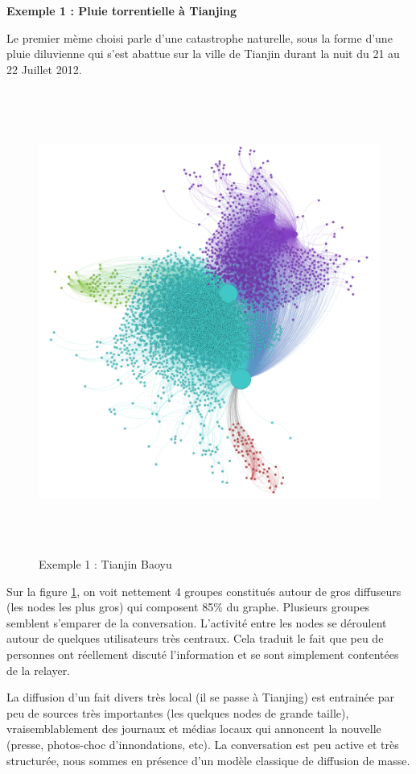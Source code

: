 \textbf{Exemple 1 : Pluie torrentielle à Tianjing}

Le premier mème choisi parle d{\textquoteright}une catastrophe naturelle, sous la forme d{\textquoteright}une pluie diluvienne qui s{\textquoteright}est abattue sur la ville de Tianjin durant la nuit du 21 au 22 Juillet 2012.

\begin{figure}[h!]
    \centering
    \includegraphics[width=6in,height=6in]{figures/chap3/chapitre3-img17.png}
    \caption{Exemple 1 : Tianjin Baoyu}
    \label{fig:graph-tianjin}
\end{figure}

Sur la figure \ref{fig:graph-tianjin}, on voit nettement 4 groupes constitués autour de gros diffuseurs (les nodes les plus gros) qui composent 85\% du graphe. Plusieurs groupes semblent s{\textquoteright}emparer de la conversation. L'activité entre les nodes se déroulent autour de quelques utilisateurs très centraux. Cela traduit le fait que peu de personnes ont réellement discuté l{\textquoteright}information et se sont simplement contentées de la relayer.


La diffusion d{\textquoteright}un fait divers très local (il se passe à Tianjing) est entrainée par peu de sources très importantes (les quelques nodes de grande taille), vraisemblablement des journaux et médias locaux qui annoncent la nouvelle (presse, photos-choc d{\textquoteright}innondations, etc). La conversation est peu active et très structurée, nous sommes en présence d{\textquoteright}un modèle classique de diffusion de masse.

